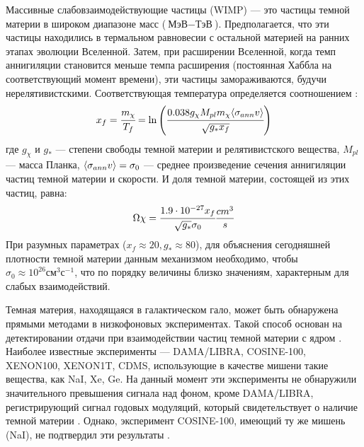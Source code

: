 Массивные слабовзаимодействующие частицы (WIMP) --- это частицы темной материи в широком диапазоне масс ($\text{МэВ}-\text{ТэВ}$). Предполагается, что эти частицы находились в термальном равновесии с остальной материей на ранних этапах эволюции Вселенной. Затем, при расширении Вселенной, когда темп аннигиляции становится меньше темпа расширения (постоянная Хаббла на соответствующий момент времени), эти частицы замораживаются, будучи нерелятивистскими. Соответствующая температура определяется соотношением \cite{Kolb:1990vq}: 
\begin{equation}
	x_f = \cfrac{m_{\chi} }{T_f} = \ln {\left(\cfrac{0.038 g_{\chi} M_{pl} m_{\chi}  \langle \sigma_{ann} v \rangle}
		{\sqrt{g_* x_f}}\right)}
\end{equation}
где $g_{\chi}$ и $g_*$ --- степени свободы темной материи и релятивистского вещества, $M_{pl}$ --- масса Планка, $\langle \sigma_{ann} v \rangle = \sigma_0$ --- среднее произведение сечения аннигиляции частиц темной материи и скорости. И доля темной материи, состоящей из этих частиц, равна: 
\begin{equation}
	\Omega{\chi} = \cfrac{{1.9}\cdot 10^{-27} x_f}{\sqrt{g_*} \sigma_0} \frac{cm^3}{s}
\end{equation}
При разумных параметрах ($x_f \approx 20, g_* \approx 80$), для объяснения сегодняшней плотности темной материи данным механизмом необходимо, чтобы $\sigma_0 \approx 10^{26} \text{см}^3\text{с}^{-1}$, что по порядку величины близко значениям, характерным для слабых взаимодействий.

Темная материя, находящаяся в галактическом гало, может быть обнаружена прямыми методами в низкофоновых экспериментах. Такой способ основан на детектировании отдачи при взаимодействии частиц темной материи с ядром \cite{Schumann_2019}. Наиболее известные эксперименты --- DAMA/LIBRA, COSINE-100, XENON100, XENON1T, CDMS, использующие в качестве мишени такие вещества, как NaI, Xe, Ge. На данный момент эти эксперименты не обнаружили значительного превышения сигнала над фоном, кроме DAMA/LIBRA, регистрирующий сигнал годовых модуляций, который свидетельствует о наличие темной материи \cite{Bernabei_2018}. Однако, эксперимент COSINE-100, имеющий ту же мишень (NaI), не подтвердил эти результаты \cite{Adhikari_2022}.

